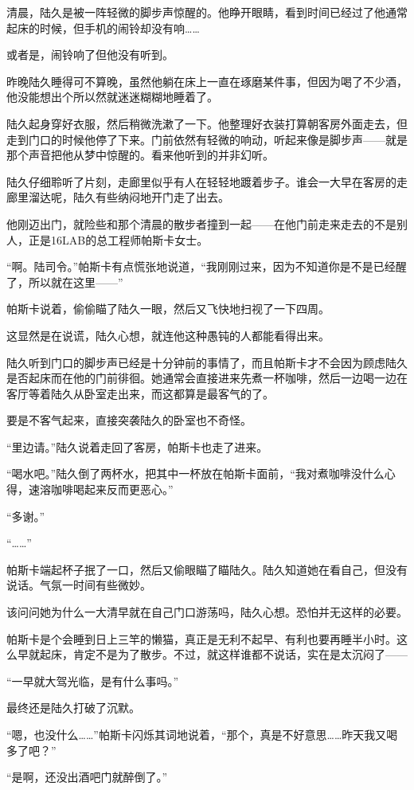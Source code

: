 清晨，陆久是被一阵轻微的脚步声惊醒的。他睁开眼睛，看到时间已经过了他通常起床的时候，但手机的闹铃却没有响……

或者是，闹铃响了但他没有听到。

昨晚陆久睡得可不算晚，虽然他躺在床上一直在琢磨某件事，但因为喝了不少酒，他没能想出个所以然就迷迷糊糊地睡着了。

陆久起身穿好衣服，然后稍微洗漱了一下。他整理好衣装打算朝客房外面走去，但走到门口的时候他停了下来。门前依然有轻微的响动，听起来像是脚步声——就是那个声音把他从梦中惊醒的。看来他听到的并非幻听。

陆久仔细聆听了片刻，走廊里似乎有人在轻轻地踱着步子。谁会一大早在客房的走廊里溜达呢，陆久有些纳闷地开门走了出去。

他刚迈出门，就险些和那个清晨的散步者撞到一起——在他门前走来走去的不是别人，正是16LAB的总工程师帕斯卡女士。

“啊。陆司令。”帕斯卡有点慌张地说道，“我刚刚过来，因为不知道你是不是已经醒了，所以就在这里——”

帕斯卡说着，偷偷瞄了陆久一眼，然后又飞快地扫视了一下四周。

这显然是在说谎，陆久心想，就连他这种愚钝的人都能看得出来。

陆久听到门口的脚步声已经是十分钟前的事情了，而且帕斯卡才不会因为顾虑陆久是否起床而在他的门前徘徊。她通常会直接进来先煮一杯咖啡，然后一边喝一边在客厅等着陆久从卧室走出来，而这都算是最客气的了。

要是不客气起来，直接突袭陆久的卧室也不奇怪。

“里边请。”陆久说着走回了客房，帕斯卡也走了进来。

“喝水吧。”陆久倒了两杯水，把其中一杯放在帕斯卡面前，“我对煮咖啡没什么心得，速溶咖啡喝起来反而更恶心。”

“多谢。”

“……”

帕斯卡端起杯子抿了一口，然后又偷眼瞄了瞄陆久。陆久知道她在看自己，但没有说话。气氛一时间有些微妙。

该问问她为什么一大清早就在自己门口游荡吗，陆久心想。恐怕并无这样的必要。

帕斯卡是个会睡到日上三竿的懒猫，真正是无利不起早、有利也要再睡半小时。这么早就起床，肯定不是为了散步。不过，就这样谁都不说话，实在是太沉闷了——

“一早就大驾光临，是有什么事吗。”

最终还是陆久打破了沉默。

“嗯，也没什么……”帕斯卡闪烁其词地说着，“那个，真是不好意思……昨天我又喝多了吧？”

“是啊，还没出酒吧门就醉倒了。”

